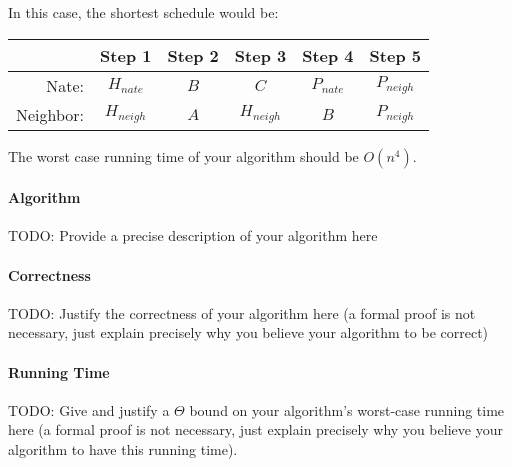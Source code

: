 {In this case, the shortest schedule would be:

\begin{center}
\begin{tabular}{r|c c c c c}
    & Step 1 & Step 2 & Step 3 & Step 4 & Step 5 \\
    \hline
    Nate:& $H_{nate}$ & $B$ & $C$ & $P_{nate}$  & $P_{neigh}$\\
     Neighbor: & $H_{neigh}$ & $A$ & $H_{neigh}$ & $B$ & $P_{neigh}$
\end{tabular}
\end{center}

The worst case running time of your algorithm should be $O(n^4)$.}

\paragraph{Algorithm} TODO: Provide a precise description of your algorithm here

\paragraph{Correctness} TODO: Justify the correctness of your algorithm here (a formal proof is not necessary, just explain precisely why you believe your algorithm to be correct)

\paragraph{Running Time} TODO: Give and justify a $\Theta$ bound on your algorithm's worst-case running time here (a formal proof is not necessary, just explain precisely why you believe your algorithm to have this running time).